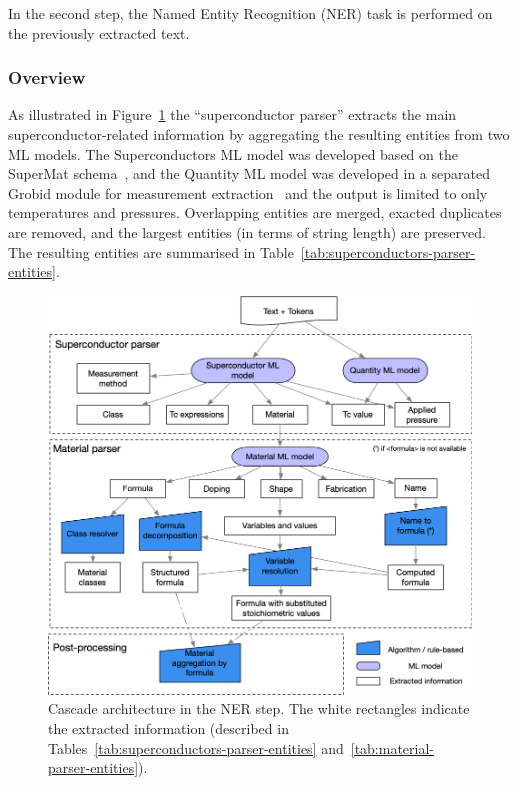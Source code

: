 In the second step, the Named Entity Recognition (NER) task is performed on the previously extracted text.

\subsubsection{Overview}

As illustrated in Figure~\ref{fig:extraction-ml-models-cascade-architecture} the ``superconductor parser'' extracts the main superconductor-related information by aggregating the resulting entities from two ML models.
The Superconductors ML model was developed based on the SuperMat schema~\cite{foppiano2021supermat}, and the Quantity ML model was developed in a separated Grobid module for measurement extraction~\cite{foppiano2019quantities} and the output is limited to only temperatures and pressures.
Overlapping entities are merged, exacted duplicates are removed, and the largest entities (in terms of string length) are preserved.
The resulting entities are summarised in Table~\ref{tab:superconductors-parser-entities}.

\begin{figure}[ht]
    \includegraphics[width=\textwidth]{figures/automatic_extraction_supercon/schema-extraction-colors}
    \caption{\label{fig:extraction-ml-models-cascade-architecture} Cascade architecture in the NER step. The white rectangles indicate the extracted information (described in Tables~\ref{tab:superconductors-parser-entities} and~\ref{tab:material-parser-entities}).}
\end{figure}

